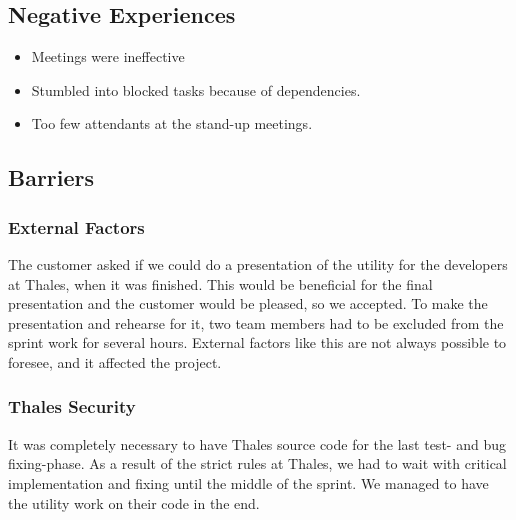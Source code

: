 \subsection{Negative Experiences}
\begin{itemize}
\item Meetings were ineffective
\item Stumbled into blocked tasks because of dependencies.
\item Too few attendants at the stand-up meetings.
\end{itemize}

\subsection{Barriers}

\subsubsection{External Factors}
The customer asked if we could do a presentation of the utility for the developers at Thales, when it was finished. This would be beneficial for the final presentation and the customer would be pleased, so we accepted. To make the presentation and rehearse for it, two team members had to be excluded from the sprint work for several hours. External factors like this are not always possible to foresee, and it affected the project.

\subsubsection{Thales Security}
It was completely necessary to have Thales source code for the last test- and bug fixing-phase. As a result of the strict rules at Thales, we had to wait with critical implementation and fixing until the middle of the sprint. We managed to have the utility work on their code in the end.


